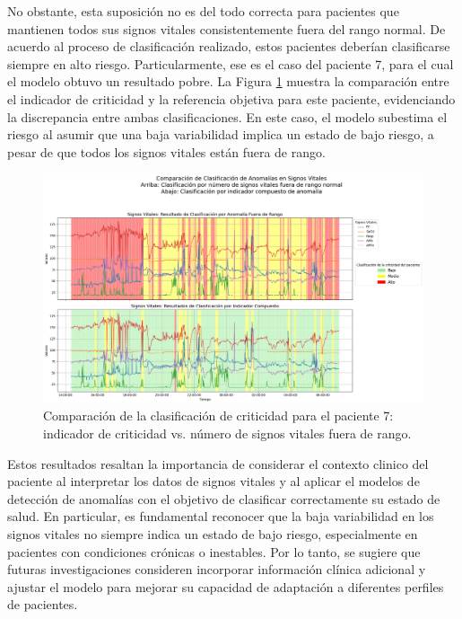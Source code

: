 No obstante, esta suposición no es del todo correcta para pacientes que mantienen todos sus signos vitales consistentemente fuera del rango normal. De acuerdo al proceso de clasificación realizado, estos pacientes deberían clasificarse siempre en alto riesgo. Particularmente, ese es el caso del paciente 7, para el cual el modelo obtuvo un resultado pobre. La Figura \ref{fig:comparacion_clasificacion_paciente7} muestra la comparación entre el indicador de criticidad y la referencia objetiva para este paciente, evidenciando la discrepancia entre ambas clasificaciones. En este caso, el modelo subestima el riesgo al asumir que una baja variabilidad implica un estado de bajo riesgo, a pesar de que todos los signos vitales están fuera de rango.

\begin{figure}[H]
  \centering
  \includegraphics[width=\textwidth]{Images/comparacion_indicador_con_fuera_de_rango_paciente_7.png}
  \caption{Comparación de la clasificación de criticidad para el paciente 7: indicador de criticidad vs. número de signos vitales fuera de rango.}

  \label{fig:comparacion_clasificacion_paciente7}
\end{figure}

Estos resultados resaltan la importancia de considerar el contexto clinico del paciente al interpretar los datos de signos vitales y al aplicar el modelos de detección de anomalías con el objetivo de clasificar correctamente su estado de salud. En particular, es fundamental reconocer que la baja variabilidad en los signos vitales no siempre indica un estado de bajo riesgo, especialmente en pacientes con condiciones crónicas o inestables. Por lo tanto, se sugiere que futuras investigaciones consideren incorporar información clínica adicional y ajustar el modelo para mejorar su capacidad de adaptación a diferentes perfiles de pacientes.

